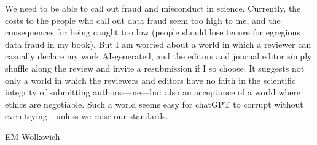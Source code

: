\documentclass[11pt]{article}
\begin{document}
We need to be able to call out fraud and misconduct in science. Currently, the costs to the people who call out data fraud seem too high to me, and the consequences for being caught too low (people should lose tenure for egregious data fraud in my book). But I am worried about a world in which a reviewer can casually declare my work AI-generated, and the editors and journal editor simply shuffle along the review and invite a resubmission if I so choose. It suggests not only a world in which the reviewers and editors have no faith in the scientific integrity of submitting authors---me---but also an acceptance of a world where ethics are negotiable. Such a world seems easy for chatGPT to corrupt without even trying---unless we raise our standards. 

EM Wolkovich
\end{document}
